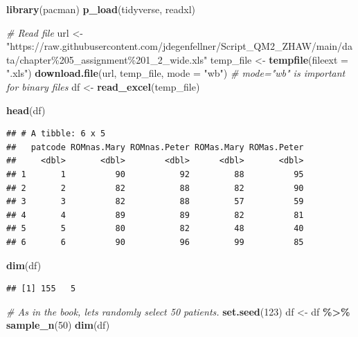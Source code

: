 \documentclass[
]{book}
\newenvironment{Shaded}{\begin{snugshade}}{\end{snugshade}}
\newcommand{\AttributeTok}[1]{\textcolor[rgb]{0.13,0.29,0.53}{#1}}
\newcommand{\CommentTok}[1]{\textcolor[rgb]{0.56,0.35,0.01}{\textit{#1}}}
\newcommand{\DecValTok}[1]{\textcolor[rgb]{0.00,0.00,0.81}{#1}}
\newcommand{\FunctionTok}[1]{\textcolor[rgb]{0.13,0.29,0.53}{\textbf{#1}}}
\newcommand{\NormalTok}[1]{#1}
\newcommand{\OtherTok}[1]{\textcolor[rgb]{0.56,0.35,0.01}{#1}}
\newcommand{\SpecialCharTok}[1]{\textcolor[rgb]{0.81,0.36,0.00}{\textbf{#1}}}
\newcommand{\StringTok}[1]{\textcolor[rgb]{0.31,0.60,0.02}{#1}}
\begin{document}
\begin{Shaded}
\begin{Highlighting}[]
\FunctionTok{library}\NormalTok{(pacman)}
\FunctionTok{p\_load}\NormalTok{(tidyverse, readxl)}

\CommentTok{\# Read file}
\NormalTok{url }\OtherTok{\textless{}{-}} \StringTok{"https://raw.githubusercontent.com/jdegenfellner/Script\_QM2\_ZHAW/main/data/chapter\%205\_assignment\%201\_2\_wide.xls"}
\NormalTok{temp\_file }\OtherTok{\textless{}{-}} \FunctionTok{tempfile}\NormalTok{(}\AttributeTok{fileext =} \StringTok{".xls"}\NormalTok{)}
\FunctionTok{download.file}\NormalTok{(url, temp\_file, }\AttributeTok{mode =} \StringTok{"wb"}\NormalTok{)  }\CommentTok{\# mode="wb" is important for binary files}
\NormalTok{df }\OtherTok{\textless{}{-}} \FunctionTok{read\_excel}\NormalTok{(temp\_file)}

\FunctionTok{head}\NormalTok{(df)}
\end{Highlighting}
\end{Shaded}

\begin{verbatim}
## # A tibble: 6 x 5
##   patcode ROMnas.Mary ROMnas.Peter ROMas.Mary ROMas.Peter
##     <dbl>       <dbl>        <dbl>      <dbl>       <dbl>
## 1       1          90           92         88          95
## 2       2          82           88         82          90
## 3       3          82           88         57          59
## 4       4          89           89         82          81
## 5       5          80           82         48          40
## 6       6          90           96         99          85
\end{verbatim}

\begin{Shaded}
\begin{Highlighting}[]
\FunctionTok{dim}\NormalTok{(df)}
\end{Highlighting}
\end{Shaded}

\begin{verbatim}
## [1] 155   5
\end{verbatim}

\begin{Shaded}
\begin{Highlighting}[]
\CommentTok{\# As in the book, let\textquotesingle{}s randomly select 50 patients.}
\FunctionTok{set.seed}\NormalTok{(}\DecValTok{123}\NormalTok{)}
\NormalTok{df }\OtherTok{\textless{}{-}}\NormalTok{ df }\SpecialCharTok{\%\textgreater{}\%} \FunctionTok{sample\_n}\NormalTok{(}\DecValTok{50}\NormalTok{)}
\FunctionTok{dim}\NormalTok{(df)}
\end{Highlighting}
\end{Shaded}
\end{document}
